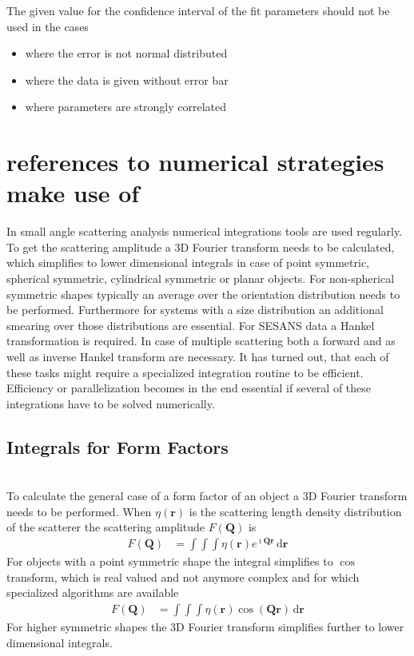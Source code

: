 The given value for the confidence interval of the fit parameters should not be used in the cases
\begin{itemize}
\item where the error is not normal distributed
\item where the data is given without error bar
\item where parameters are strongly correlated
\end{itemize}

\clearpage
\section{references to numerical strategies \SASfit make use of}
In small angle scattering analysis numerical integrations tools are used regularly. To get the scattering amplitude a 3D Fourier transform needs to be calculated, which simplifies to lower dimensional integrals in case of point symmetric, spherical symmetric, cylindrical symmetric or planar objects. For non-spherical symmetric shapes typically an average over the orientation distribution needs to be performed. Furthermore for systems with a size distribution an additional smearing over those distributions are essential. For SESANS data a Hankel transformation is required. In case of multiple scattering both a forward and as well as inverse Hankel transform are necessary. It has turned out, that each of these tasks might require a specialized integration routine to be efficient. Efficiency or parallelization becomes in the end essential if several of these integrations have to be solved numerically.

\subsection{Integrals for Form Factors} ~\\

To calculate the general case of a form factor of an object a 3D Fourier transform needs to be performed. When $\eta(\mathbf{r})$ is the scattering length density distribution of the scatterer the scattering amplitude $F(\mathbf{Q})$ is
\begin{align}
F(\mathbf{Q}) &= \int\!\! \int\!\! \int \eta(\mathbf{r}) e^{\imath \mathbf{Q}\mathbf{r}}\,\mathrm{d}\mathbf{r}
\end{align}
For objects with a point symmetric shape the integral simplifies to $\cos$ transform, which is real valued and not anymore complex and for which specialized algorithms are available \cite{Burkardt,Ooura1996,Chase1969,Ooura_1991,Team2024,Team2024a}
\begin{align}
F(\mathbf{Q}) &= \int\!\! \int\!\! \int \eta(\mathbf{r}) \cos\left( \mathbf{Q}\mathbf{r} \right)\,\mathrm{d}\mathbf{r}
\end{align}
For higher symmetric shapes the 3D Fourier transform simplifies further to lower dimensional integrals.

